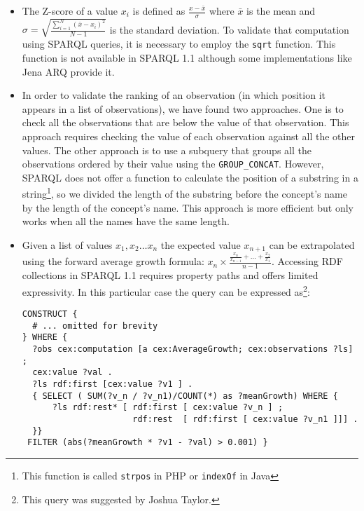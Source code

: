 \begin{itemize} 

\item The Z-score of a value $x_i$ is defined as $\frac{x - \bar{x}}{\sigma}$
where $\bar{x}$ is the mean and $\sigma=\sqrt{\frac{\sum_{i=1}^{N}(\bar{x}-x_i)^2}{N -
1}}$ is the standard deviation. To validate that computation using SPARQL
queries, it is necessary to employ the \lstinline|sqrt| function. 
This function is not available in SPARQL 1.1 although some implementations 
 like Jena
 ARQ 
 provide it.

\item In order to validate the ranking of an observation (in which position it
appears in a list of observations), we have found two approaches. One is to
check all the observations that are below the value of that observation. 
This approach requires checking the value of each observation against all the
other values. The other approach is to use a subquery that groups all the
observations ordered by their value using the \lstinline|GROUP_CONCAT|. 
However, SPARQL does not offer a function to calculate the position
of a substring in a string\footnote{This function is called \lstinline|strpos| in PHP or \lstinline|indexOf| in Java}, 
so we divided the length of the substring before the concept's 
name by the length of the concept's name. 
This approach is more efficient but only works when all the names have
the same length.

\item Given a list of values $x_1,x_2\ldots{}x_n$ the expected value
$x_{n+1}$ can be extrapolated using the forward average growth formula: 
$x_n\times{\frac{\frac{x_{n}}{x_{n-1}}+\ldots{}+\frac{x_{2}}{x_1}}{n-1}}$. 
Accessing RDF collections in SPARQL 1.1 requires property paths 
and offers limited expressivity. In this particular case 
the query can be expressed 
as\footnote{This query was suggested by Joshua Taylor.}:

\begin{lstlisting}[style=SPARQL]
CONSTRUCT {
  # ... omitted for brevity
} WHERE { 
  ?obs cex:computation [a cex:AverageGrowth; cex:observations ?ls] ;
  cex:value ?val .
  ?ls rdf:first [cex:value ?v1 ] .
  { SELECT ( SUM(?v_n / ?v_n1)/COUNT(*) as ?meanGrowth) WHERE {
      ?ls rdf:rest* [ rdf:first [ cex:value ?v_n ] ; 
                      rdf:rest  [ rdf:first [ cex:value ?v_n1 ]]] .
  }} 
 FILTER (abs(?meanGrowth * ?v1 - ?val) > 0.001) }
\end{lstlisting}

\end{itemize}
